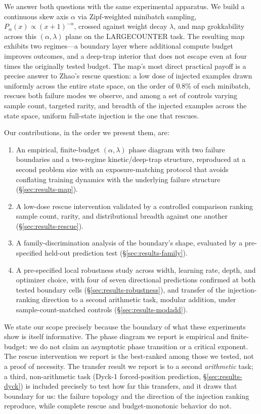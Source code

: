 \documentclass[11pt]{article}
\begin{document}
We answer both questions with the same experimental apparatus. We build a continuous skew axis $\alpha$ via Zipf-weighted minibatch sampling, $P_\alpha(x)\propto(x+1)^{-\alpha}$, crossed against weight decay $\lambda$, and map grokkability across this $(\alpha,\lambda)$ plane on the LARGECOUNTER task. The resulting map exhibits two regimes---a boundary layer where additional compute budget improves outcomes, and a deep-trap interior that does not escape even at four times the originally tested budget. The map's most direct practical payoff is a precise answer to Zhao's rescue question: a low dose of injected examples drawn uniformly across the entire state space, on the order of $0.8\%$ of each minibatch, rescues both failure modes we observe, and among a set of controls varying sample count, targeted rarity, and breadth of the injected examples across the state space, uniform full-state injection is the one that rescues.

Our contributions, in the order we present them, are:
\begin{enumerate}
\item An empirical, finite-budget $(\alpha,\lambda)$ phase diagram with two failure boundaries and a two-regime kinetic/deep-trap structure, reproduced at a second problem size with an exposure-matching protocol that avoids conflating training dynamics with the underlying failure structure (\S\ref{sec:results-map}).
\item A low-dose rescue intervention validated by a controlled comparison ranking sample count, rarity, and distributional breadth against one another (\S\ref{sec:results-rescue}).
\item A family-discrimination analysis of the boundary's shape, evaluated by a pre-specified held-out prediction test (\S\ref{sec:results-family}).
\item A pre-specified local robustness study across width, learning rate, depth, and optimizer choice, with four of seven directional predictions confirmed at both tested boundary cells (\S\ref{sec:results-robustness}), and transfer of the injection-ranking direction to a second arithmetic task, modular addition, under sample-count-matched controls (\S\ref{sec:results-modadd}).
\end{enumerate}

We state our scope precisely because the boundary of what these experiments show is itself informative. The phase diagram we report is empirical and finite-budget: we do not claim an asymptotic phase transition or a critical exponent. The rescue intervention we report is the best-ranked among those we tested, not a proof of necessity. The transfer result we report is to a second \emph{arithmetic} task; a third, non-arithmetic task (Dyck-1 forced-position prediction, \S\ref{sec:results-dyck}) is included precisely to test how far this transfers, and it draws that boundary for us: the failure topology and the direction of the injection ranking reproduce, while complete rescue and budget-monotonic behavior do not.
\end{document}
